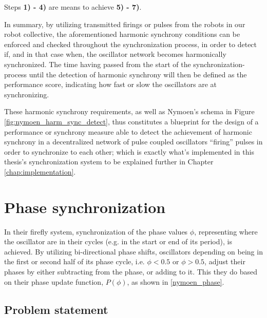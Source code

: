 	Steps \textbf{1) - 4)} are means to achieve \textbf{5) - 7)}.
	
	In summary, by utilizing transmitted firings or pulses from the robots in our robot collective, the aforementioned harmonic synchrony conditions can be enforced and checked throughout the synchronization process, in order to detect if, and in that case when, the oscillator network becomes harmonically synchronized. The time having passed from the start of the synchronization-process until the detection of harmonic synchrony will then be defined as the performance score, indicating how fast or slow the oscillators are at synchronizing.
	
	These harmonic synchrony requirements, as well as Nymoen's schema in Figure \ref{fig:nymoen_harm_sync_detect}, thus constitutes a blueprint for the design of a performance or synchrony measure able to detect the achievement of harmonic synchrony in a decentralized network of pulse coupled oscillators ``firing'' pulses in order to synchronize to each other; which is exactly what's implemented in this thesis's synchronization system to be explained further in Chapter \ref{chap:implementation}.
	
	



\section{Phase synchronization} %
\label{sec:nymoen_phase_updates}

	In their firefly system, synchronization of the phase values $\phi$, representing where the oscillator are in their cycles (e.g. in the start or end of its period), is achieved. By utilizing bi-directional phase shifts, oscillators depending on being in the first or second half of its phase cycle, i.e. $\phi < 0.5$ or $\phi > 0.5$, adjust their phases by either subtracting from the phase, or adding to it. This they do based on their phase update function, $P(\phi)$, as shown in \eqref{nymoen_phase}.

	\subsection{Problem statement}

